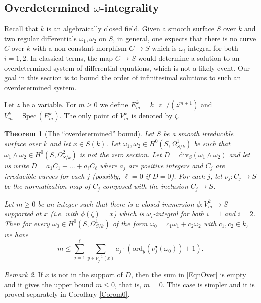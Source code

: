 \documentclass[11pt]{amsart}
\newtheorem{theorem}{Theorem}[section]
\theoremstyle{remark}
\newtheorem{remark}[theorem]{Remark}
\numberwithin{equation}{section}
\newcommand{\ord}{\mathrm{ord}}
\newcommand{\Spec}{\mathrm{Spec}\,}
\newcommand{\divi}{\mathrm{div}}
\begin{document}
\subsection{Overdetermined $\omega$-integrality}\label{SecOver} Recall that $k$ is an algebraically closed field. Given a smooth surface $S$ over $k$ and two regular differentials $\omega_1,\omega_2$ on $S$, in general, one expects that there is no curve $C$ over $k$ with a non-constant morphism $C\to S$ which is $\omega_i$-integral for both $i=1,2$. In classical terms, the map $C\to S$ would determine a solution to an overdetermined system of differential equations, which is not a likely event. Our goal in this section is to bound the order of infinitesimal solutions to such an overdetermined system.



 Let $z$ be a variable. For $m\ge 0$ we define $E_m^k=k[z]/(z^{m+1})$ and $V_m^k = \Spec(E_m^k)$. The only point of $V_m^k$ is denoted by $\zeta$. 
\begin{theorem}[The ``overdetermined'' bound] \label{ThmOver} Let $S$ be a smooth irreducible surface over $k$ and let $x\in S(k)$. Let $\omega_1,\omega_2\in H^0(S, \Omega^1_{S/k})$ be such that $\omega_1\wedge \omega_2\in H^0(S,\Omega^2_{S/k})$ is not the zero section. Let $D=\divi_S(\omega_1\wedge \omega_2)$ and let us write $D=a_1C_1+...+a_\ell C_\ell$ where $a_j$ are positive integers and $C_j$ are irreducible curves for each $j$ (possibly, $\ell=0$ if $D=0$). For each $j$, let $\nu_j:\widetilde{C}_j\to S$ be the normalization map of $C_j$ composed with the inclusion $C_j\to S$. 

Let $m\ge 0$ be an integer such that there is a closed immersion $\phi: V_m^k\to S$ supported at $x$ (i.e. with $\phi(\zeta)=x$) which is $\omega_i$-integral for both $i=1$ and $i=2$. Then for every $\omega_0\in H^0(S,\Omega^1_{S/k})$ of the form $\omega_0=c_1\omega_1+c_2\omega_2$ with $c_1,c_2\in k$, we have
\begin{equation}\label{EqnOver}
m\le \sum_{j=1}^\ell \sum_{y\in \nu_j^{-1}(x)} a_j\cdot \left(\ord_y (\nu_j^\bullet (\omega_0))+1 \right).
\end{equation}
\end{theorem}

\begin{remark}\label{RmkOver1} If $x$ is not in the support of $D$, then the sum in \eqref{EqnOver} is empty and it gives the upper bound $m\le 0$, that is, $m=0$. This case is simpler and it is proved separately in Corollary \ref{Corom0}.
\end{remark}
\end{document}
